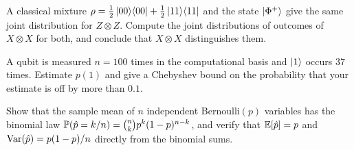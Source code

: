 \begin{exerciseset}
   A classical mixture $\rho=\tfrac12\left|00\right\rangle\!\left\langle00\right|+\tfrac12\left|11\right\rangle\!\left\langle11\right|$ and the state $\left|\Phi^+\right\rangle$ give the same joint distribution for $Z\otimes Z$. Compute the joint distributions of outcomes of $X\otimes X$ for both, and conclude that $X\otimes X$ distinguishes them.

   A qubit is measured $n=100$ times in the computational basis and $\left|1\right\rangle$ occurs $37$ times. Estimate $p(1)$ and give a Chebyshev bound on the probability that your estimate is off by more than $0.1$.

   Show that the sample mean of $n$ independent Bernoulli$(p)$ variables has the binomial law $\mathbb{P}(\hat p=k/n)=\binom nkp^k(1-p)^{n-k}$, and verify that $\mathbb{E}[\hat p]=p$ and $\operatorname{Var}(\hat p)=p(1-p)/n$ directly from the binomial sums.
\end{exerciseset}
